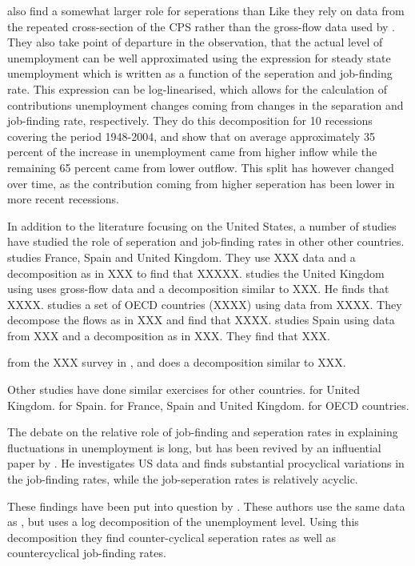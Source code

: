 \cite{Elsby2009b} also find a somewhat larger role for seperations than \cite{Shimer2012} Like \cite{Shimer2005} they rely on data from the repeated cross-section of the CPS rather than the gross-flow data used by \cite{Fujita2008}. They also take point of departure in the observation, that the actual level of unemployment can be well approximated using the expression for steady state unemployment which is written as a function of the seperation and job-finding rate. This expression can be log-linearised, which allows for the calculation of contributions unemployment changes coming from changes in the separation and job-finding rate, respectively. They do this decomposition for 10 recessions covering the period 1948-2004, and show that on average approximately 35 percent of the increase in unemployment came from higher inflow while the remaining 65 percent came from lower outflow. This split has however changed over time, as the contribution coming from higher seperation has been lower in more recent recessions. 

\cite{Yashiv2007}

In addition to the literature focusing on the United States, a number of studies have studied the role of seperation and job-finding rates in other other countries. \cite{Petrongolo2008} studies France, Spain and United Kingdom. They use XXX data and a decomposition as in XXX to find that XXXXX. \cite{Gomes2012}  studies the United Kingdom using uses gross-flow data and a decomposition similar to XXX. He finds that XXXX. \cite{Elsby2013} studies a set of OECD countries (XXXX) using data from XXXX. They decompose the flows as in XXX and find that XXXX. \cite{Silva2013} studies Spain using data from XXX and a decomposition as in XXX. They find that XXX. \

 from the XXX survey in , and does a decomposition similar to XXX. 

Other studies have done similar exercises for other countries. \cite{Gomes2012} for United Kingdom. \cite{Silva2013} for Spain. \cite{Petrongolo2008} for France, Spain and United Kingdom. \cite{Elsby2013} for OECD countries. 

The debate on the relative role of job-finding and seperation rates in explaining fluctuations in unemployment is long, but has been revived by an influential paper by \cite{Shimer}. He investigates US data and finds substantial procyclical variations in the job-finding rates, while the job-seperation rates is relatively acyclic. 

These findings have been put into question by \cite{Elsby et al}. These authors use the same data as \cite{Shimer}, but uses a log decomposition of the unemployment level. Using this decomposition they find counter-cyclical seperation rates as well as countercyclical job-finding rates. 